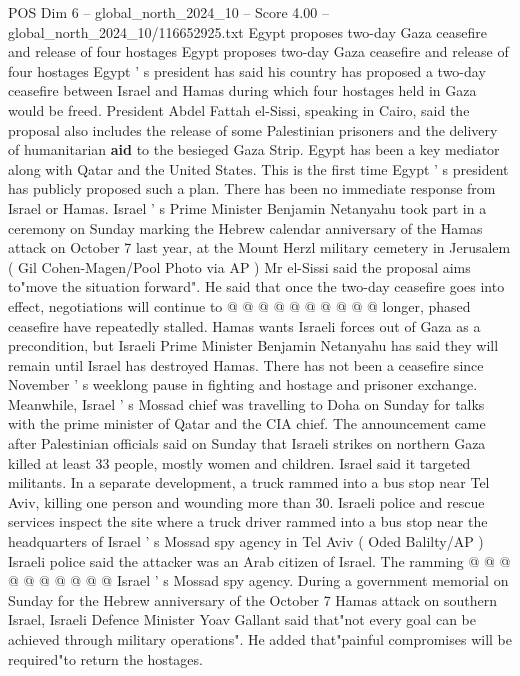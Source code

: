 \begin{textsample}{POS Dim 6 – global\_north\_2024\_10 – Score 4.00 – global\_north\_2024\_10/116652925.txt}  \label{ex:f6_pos_400}
Egypt proposes two-day Gaza ceasefire and release of four hostages Egypt proposes two-day Gaza ceasefire and release of four hostages Egypt ' s president has said his country has proposed a two-day ceasefire between Israel and Hamas during which four hostages held in Gaza would be freed.
President Abdel Fattah el-Sissi, speaking in Cairo, said the proposal also includes the release of some Palestinian prisoners and the delivery of humanitarian \textbf{aid} to the besieged Gaza Strip.
Egypt has been a key mediator along with Qatar and the United States.
This is the first time Egypt ' s president has publicly proposed such a plan.
There has been no immediate response from Israel or Hamas.
Israel ' s Prime Minister Benjamin Netanyahu took part in a ceremony on Sunday marking the Hebrew calendar anniversary of the Hamas attack on October 7 last year, at the Mount Herzl military cemetery in Jerusalem ( Gil Cohen-Magen/Pool Photo via AP ) Mr el-Sissi said the proposal aims to"move the situation forward".
He said that once the two-day ceasefire goes into effect, negotiations will continue to @ @ @ @ @ @ @ @ @ @ longer, phased ceasefire have repeatedly stalled.
Hamas wants Israeli forces out of Gaza as a precondition, but Israeli Prime Minister Benjamin Netanyahu has said they will remain until Israel has destroyed Hamas.
There has not been a ceasefire since November ' s weeklong pause in fighting and hostage and prisoner exchange.
Meanwhile, Israel ' s Mossad chief was travelling to Doha on Sunday for talks with the prime minister of Qatar and the CIA chief.
The announcement came after Palestinian officials said on Sunday that Israeli strikes on northern Gaza killed at least 33 people, mostly women and children.
Israel said it targeted militants.
In a separate development, a truck rammed into a bus stop near Tel Aviv, killing one person and wounding more than 30.
Israeli police and rescue services inspect the site where a truck driver rammed into a bus stop near the headquarters of Israel ' s Mossad spy agency in Tel Aviv ( Oded Balilty/AP ) Israeli police said the attacker was an Arab citizen of Israel.
The ramming @ @ @ @ @ @ @ @ @ @ Israel ' s Mossad spy agency.
During a government memorial on Sunday for the Hebrew anniversary of the October 7 Hamas attack on southern Israel, Israeli Defence Minister Yoav Gallant said that"not every goal can be achieved through military operations".
He added that"painful compromises will be required"to return the hostages.

\end{textsample}
